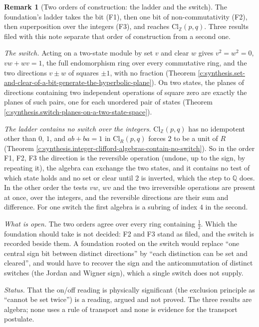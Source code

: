 \documentclass[11pt]{article}
\theoremstyle{definition}
\newtheorem{remark}[theorem]{Remark}
\theoremstyle{plain}
\newcommand{\changedmark}[2]{\marginpar{\raggedright\scriptsize\color{#1}#2}}
\providecommand{\Cl}{}\renewcommand{\Cl}{\mathrm{Cl}}
\providecommand{\Q}{}\renewcommand{\Q}{\mathbb{Q}}
\providecommand{\Z}{}\renewcommand{\Z}{\mathbb{Z}}
\begin{document}
\begin{remark}[Two orders of construction: the ladder and the switch]\label{c:note.synthesis.two-orders-of-construction-ladder-and-switch}
\changedmark{BurntOrange}{changed since the deposit}
The foundation's ladder takes the bit (F1), then one bit of non-commutativity (F2), then superposition over the integers (F3), and reaches $\Cl_{\Z}(p,q)$. Three results filed with this note separate that order of construction from a second one.

\emph{The switch.} Acting on a two-state module by set $v$ and clear $w$ gives $v^{2} = w^{2} = 0$, $vw + wv = 1$, the full endomorphism ring over every commutative ring, and the two directions $v \pm w$ of squares $\pm 1$, with no fraction (Theorem \ref{c:synthesis.set-and-clear-of-a-bit-generate-the-hyperbolic-plane}). On two states, the planes of directions containing two independent operations of square zero are exactly the planes of such pairs, one for each unordered pair of states (Theorem \ref{c:synthesis.switch-planes-on-a-two-state-space}).

\emph{The ladder contains no switch over the integers.} $\Cl_{\Z}(p,q)$ has no idempotent other than $0$, $1$, and $ab + ba = 1$ in $\Cl_{R}(p,q)$ forces $2$ to be a unit of $R$ (Theorem \ref{c:synthesis.integer-clifford-algebras-contain-no-switch}). So in the order F1, F2, F3 the direction is the reversible operation (undone, up to the sign, by repeating it), the algebra can exchange the two states, and it contains no test of which state holds and no set or clear until $2$ is inverted, which the step to $\Q$ does. In the other order the tests $vw$, $wv$ and the two irreversible operations are present at once, over the integers, and the reversible directions are their sum and difference. For one switch the first algebra is a subring of index $4$ in the second.

\emph{What is open.} The two orders agree over every ring containing $\tfrac12$. Which the foundation should take is not decided: F2 and F3 stand as filed, and the switch is recorded beside them. A foundation rooted on the switch would replace ``one central sign bit between distinct directions'' by ``each distinction can be set and cleared'', and would have to recover the sign and the anticommutation of distinct switches (the Jordan and Wigner sign), which a single switch does not supply.

\emph{Status.} That the on/off reading is physically significant (the exclusion principle as ``cannot be set twice'') is a reading, argued and not proved. The three results are algebra; none uses a rule of transport and none is evidence for the transport postulate.
\end{remark}
\end{document}
